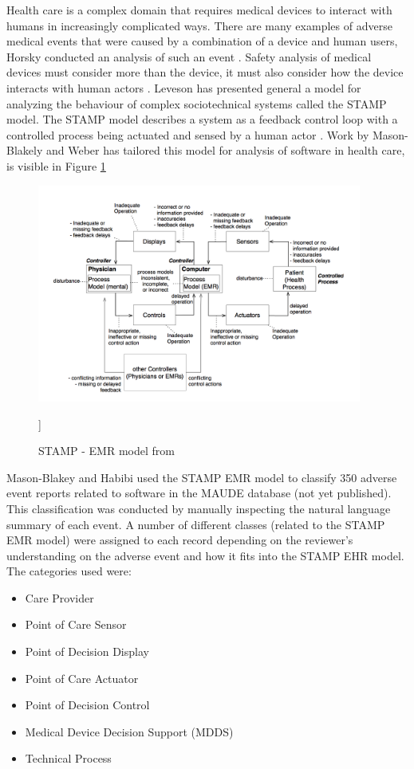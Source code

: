 \documentclass[11pt, notitlepage,abstracton,oneside]{article}   	%
\begin{document}
Health care is a complex domain that requires medical devices to interact with humans in increasingly complicated ways. There are many examples of adverse medical events that were caused by a combination of a device and human users, Horsky conducted an analysis of such an event \cite{horsky_2005}. Safety analysis of medical devices must consider more than the device, it must also consider how the device interacts with human actors \cite{karsh_health_2010}. Leveson has presented general a model for analyzing the behaviour of complex sociotechnical systems called the STAMP model. The STAMP model describes a system as a feedback control loop with a controlled process being actuated and sensed by a human actor \cite{leveson_engineering_2012}. Work by Mason-Blakely and Weber has tailored this model for analysis of software in health care, is visible in Figure \ref{fig:stamp-emr} \cite{stamp_emr_2011}

\begin{figure}[ht]
	\centering
	\includegraphics[width=0.95\textwidth]{figures/stamp-emr}
	\caption{STAMP - EMR model from \cite{stamp_emr_2011}}
	]\label{fig:stamp-emr}
\end{figure}

Mason-Blakey and Habibi used the STAMP EMR model to classify 350 adverse event reports related to software in the MAUDE database (not yet published). This classification was conducted by manually inspecting the natural language summary of each event. A number of different classes (related to the STAMP EMR model) were assigned to each record depending on the reviewer's understanding on the adverse event and how it fits into the STAMP EHR model. The categories used were: 

\begin{itemize}
	\item Care Provider
	\item Point of Care Sensor
	\item Point of Decision Display
	\item Point of Care Actuator
	\item Point of Decision Control
	\item Medical Device Decision Support (MDDS)
	\item Technical Process
\end{itemize}
\end{document}

